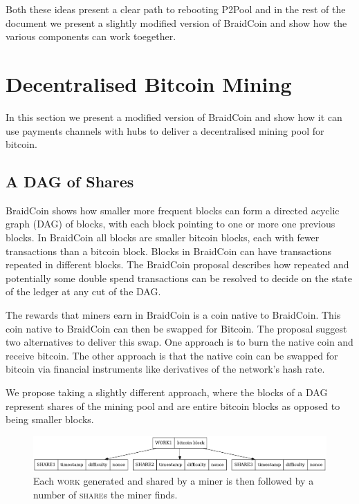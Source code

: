 \documentclass{article}
\begin{document}
Both these ideas present a clear path to rebooting P2Pool and in the
rest of the document we present a slightly modified version of
BraidCoin and show how the various components can work toegether.

\section{Decentralised Bitcoin Mining}

In this section we present a modified version of BraidCoin and show
how it can use payments channels with hubs to deliver a decentralised
mining pool for bitcoin.

\subsection{A DAG of Shares}

BraidCoin shows how smaller more frequent blocks can form a directed
acyclic graph (DAG) of blocks, with each block pointing to one or more
one previous blocks. In BraidCoin all blocks are smaller bitcoin
blocks, each with fewer transactions than a bitcoin block. Blocks in
BraidCoin can have transactions repeated in different blocks. The
BraidCoin proposal describes how repeated and potentially some double
spend transactions can be resolved to decide on the state of the
ledger at any cut of the DAG.\

The rewards that miners earn in BraidCoin is a coin native to
BraidCoin. This coin native to BraidCoin can then be swapped for
Bitcoin. The proposal suggest two alternatives to deliver this
swap. One approach is to burn the native coin and receive bitcoin. The
other approach is that the native coin can be swapped for bitcoin via
financial instruments like derivatives of the network's hash rate.

We propose taking a slightly different approach, where the blocks of a
DAG represent shares of the mining pool and are entire bitcoin blocks
as opposed to being smaller blocks.

\begin{figure}[h]
  \begin{center}
    \includegraphics[width=1.0\textwidth]{work-share}
    \caption{Each \textsc{work} generated and shared by a miner is then
      followed by a number of \textsc{share}s the miner
      finds.}\label{fig:work-share}
    \end{center}
\end{figure}
\end{document}
